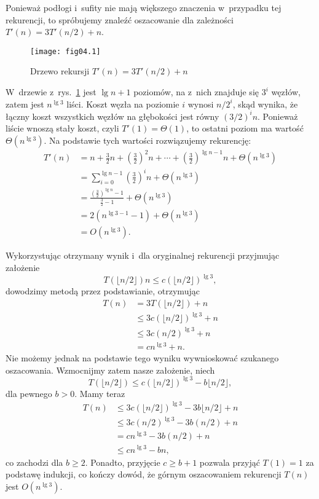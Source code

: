 
\exercise %
Ponieważ podłogi i~sufity nie mają większego znaczenia w~przypadku tej rekurencji, to spróbujemy znaleźć oszacowanie dla zależności $T'(n)=3T'(n/2)+n$.
\begin{figure}[ht]
	\begin{center}
		\texttt{[image: fig04.1]}
	\end{center}
	\caption{Drzewo rekursji $T'(n)=3T'(n/2)+n$} \label{fig:4.2-1}
\end{figure}
W~drzewie z~rys.~\ref{fig:4.2-1} jest $\lg n+1$ poziomów, na  z~nich znajduje się $3^i$ węzłów, zatem jest $n^{\lg3}$ liści. Koszt węzła na poziomie $i$ wynosi $n/2^i$, skąd wynika, że łączny koszt wszystkich węzłów na  głębokości jest równy $(3/2)^in$. Ponieważ liście wnoszą stały koszt, czyli $T'(1)=\Theta(1)$, to ostatni poziom ma wartość $\Theta(n^{\lg3})$. Na podstawie tych wartości rozwiązujemy rekurencję:
\begin{align*}
	T'(n) &= n+\frac{3}{2}n+\left(\frac{3}{2}\right)^2n+\cdots+\left(\frac{3}{2}\right)^{\lg n-1}n+\Theta(n^{\lg 3}) \\
	&= \sum_{i=0}^{\lg n-1}\left(\frac{3}{2}\right)^in+\Theta(n^{\lg 3}) \\
	&= \frac{\left(\frac{3}{2}\right)^{\lg n}-1}{\frac{3}{2}-1}+\Theta(n^{\lg 3}) \\[1mm]
	&= 2(n^{\lg 3-1}-1)+\Theta(n^{\lg 3}) \\
	&= O(n^{\lg 3}).
\end{align*}

Wykorzystując otrzymany wynik i~dla oryginalnej rekurencji przyjmując założenie
\[
	T(\lfloor n/2\rfloor)n\le c(\lfloor n/2\rfloor)^{\lg 3},
\]
dowodzimy metodą przez podstawianie, otrzymując
\begin{align*}
	T(n) &= 3T(\lfloor n/2\rfloor)+n \\
	&\le 3c(\lfloor n/2\rfloor)^{\lg 3}+n \\
	&\le 3c(n/2)^{\lg 3}+n \\
	&= cn^{\lg 3}+n.
\end{align*}
Nie możemy jednak na podstawie tego wyniku wywnioskować szukanego oszacowania. Wzmocnijmy zatem nasze założenie, niech
\[
	T(\lfloor n/2\rfloor) \le c(\lfloor n/2\rfloor)^{\lg 3}-b\lfloor n/2\rfloor,
\]
dla pewnego $b>0$. Mamy teraz
\begin{align*}
	T(n) &\le 3c(\lfloor n/2\rfloor)^{\lg 3}-3b\lfloor n/2\rfloor+n \\
	&\le 3c(n/2)^{\lg 3}-3b(n/2)+n \\
	&= cn^{\lg 3}-3b(n/2)+n \\
	&\le cn^{\lg 3}-bn,
\end{align*}
co zachodzi dla $b\ge2$. Ponadto, przyjęcie $c\ge b+1$ pozwala przyjąć $T(1)=1$ za podstawę indukcji, co kończy dowód, że górnym oszacowaniem rekurencji $T(n)$ jest $O(n^{\lg3})$.

